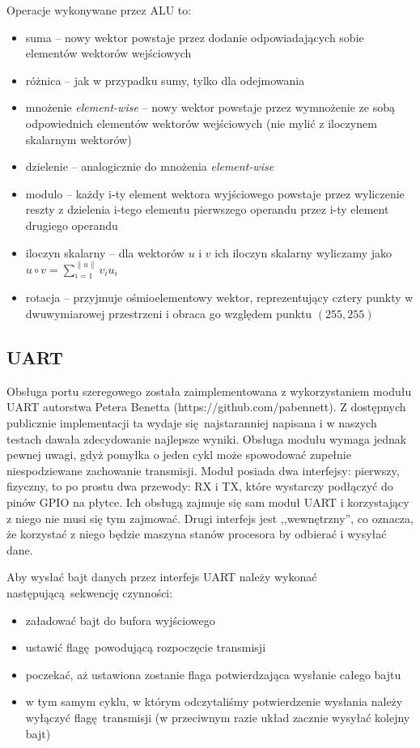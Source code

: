Operacje wykonywane przez ALU to:
\begin{itemize}
  \item suma -- nowy wektor powstaje przez dodanie odpowiadających sobie elementów wektorów wejściowych
  \item różnica -- jak w przypadku sumy, tylko dla odejmowania
  \item mnożenie \textit{element-wise} -- nowy wektor powstaje przez wymnożenie ze sobą odpowiednich elementów wektorów wejściowych (nie mylić z iloczynem skalarnym wektorów)
  \item dzielenie -- analogicznie do mnożenia \textit{element-wise}
  \item modulo -- każdy i-ty element wektora wyjściowego powstaje przez wyliczenie reszty z dzielenia i-tego elementu pierwszego operandu przez i-ty element drugiego operandu
  \item iloczyn skalarny -- dla wektorów $u$ i $v$ ich iloczyn skalarny wyliczamy jako $u \circ v = \sum_{i=1}^{\|u\|} v_i u_i $
  \item rotacja -- przyjmuje ośmioelementowy wektor, reprezentujący cztery punkty w dwuwymiarowej przestrzeni i obraca go względem punktu $(255, 255)$
\end{itemize}

\subsection{UART}

Obsługa portu szeregowego została zaimplementowana z wykorzystaniem modułu UART autorstwa Petera Benetta (https://github.com/pabennett). Z dostępnych publicznie implementacji ta wydaje się najstaranniej napisana i w naszych testach dawała zdecydowanie najlepsze wyniki. Obsługa modułu wymaga jednak pewnej uwagi, gdyż pomyłka o jeden cykl może spowodować zupełnie niespodziewane zachowanie transmisji. Moduł posiada dwa interfejsy: pierwszy, fizyczny, to po prostu dwa przewody: RX i TX, które wystarczy podłączyć do pinów GPIO na płytce. Ich obsługą zajmuje się sam moduł UART i korzystający z niego nie musi się tym zajmować. Drugi interfejs jest ,,wewnętrzny'', co oznacza, że korzystać z niego będzie maszyna stanów procesora by odbierać i wysyłać dane.

Aby wysłać bajt danych przez interfejs UART należy wykonać następującą sekwencję czynności:
\begin{itemize}
  \item załadować bajt do bufora wyjściowego
  \item ustawić flagę powodującą rozpoczęcie transmisji
  \item poczekać, aż ustawiona zostanie flaga potwierdzająca wysłanie całego bajtu
  \item w tym samym cyklu, w którym odczytaliśmy potwierdzenie wysłania należy wyłączyć flagę transmisji (w przeciwnym razie układ zacznie wysyłać kolejny bajt)
\end{itemize}

